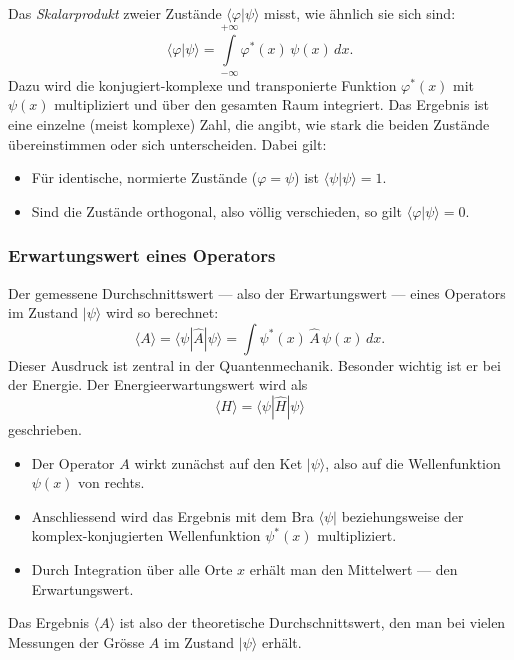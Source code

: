 Das \emph{Skalarprodukt} zweier Zustände $\langle \varphi | \psi \rangle$ misst, wie ähnlich sie sich sind:
%
\begin{equation}
\langle \varphi | \psi \rangle = \int\limits_{-\infty}^{+\infty} \varphi^*(x)\,\psi(x)\,dx.
\end{equation}
Dazu wird die konjugiert-komplexe und transponierte Funktion $\varphi^*(x)$ mit $\psi(x)$ multipliziert und über den gesamten Raum integriert.
Das Ergebnis ist eine einzelne (meist komplexe) Zahl, die angibt, wie stark die beiden Zustände übereinstimmen oder sich unterscheiden. 
Dabei gilt:
\begin{itemize}
	\item Für identische, normierte Zustände ($\varphi = \psi$) ist $\langle \psi | \psi \rangle = 1$.
	\item Sind die Zustände orthogonal, also völlig verschieden, so gilt $\langle \varphi | \psi \rangle  = 0$.
\end{itemize}

\subsubsection{Erwartungswert eines Operators\label{fourier:subsubsection:erwartungswertEinesOperators}}
Der gemessene Durchschnittswert --- also der Erwartungswert --- eines Operators im Zustand $|\psi\rangle$ wird so berechnet:
%
\begin{equation}
	\langle A \rangle = \langle \psi | \hat{A} | \psi \rangle = \int \psi^*(x)\,\hat{A}\,\psi(x)\,dx.
\end{equation}
Dieser Ausdruck ist zentral in der Quantenmechanik.
Besonder wichtig ist er bei der Energie. Der Energieerwartungswert wird als
\begin{equation}
	\langle H \rangle = \langle \psi|\hat{H}|\psi \rangle
\end{equation}
geschrieben.
\begin{itemize}
	\item Der Operator $A$ wirkt zunächst auf den Ket $|\psi\rangle$, also auf die Wellenfunktion $\psi(x)$ von rechts.
	\item Anschliessend wird das Ergebnis mit dem Bra $\langle \psi|$ beziehungsweise der komplex-konjugierten Wellenfunktion $\psi^*(x)$ multipliziert.
	\item Durch Integration über alle Orte $x$ erhält man den Mittelwert --- den Erwartungswert.
\end{itemize}
Das Ergebnis $\langle A \rangle$ ist also der theoretische Durchschnittswert, den man bei vielen Messungen der Grösse $A$ im Zustand $|\psi\rangle$ erhält.

